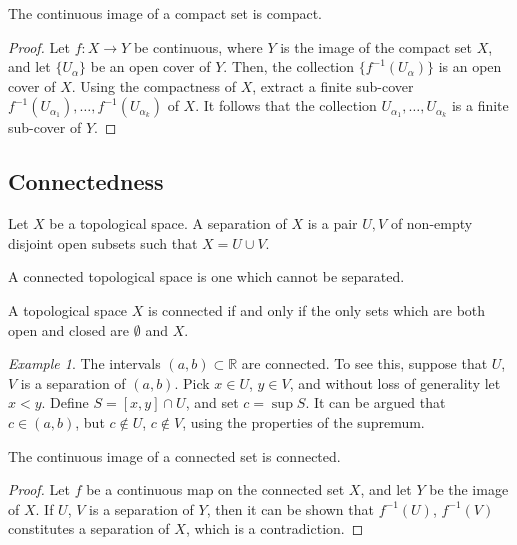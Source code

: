 \documentclass[11pt]{article}
\newcommand{\R}{\mathbb{R}}
\theoremstyle{definition}
\theoremstyle{remark}
\newtheorem*{example}{Example}
\numberwithin{equation}{section}
\begin{document}
    \begin{theorem}
        The continuous image of a compact set is compact.
    \end{theorem}
    \begin{proof}
        Let $f\colon X \to Y$ be continuous, where $Y$ is the image of the compact
        set $X$, and let $\{U_\alpha\}$ be an open cover of $Y$. Then, the collection
        $\{f^{-1}(U_\alpha)\}$ is an open cover of $X$. Using the compactness of $X$,
        extract a finite sub-cover $f^{-1}(U_{\alpha_1}), \dots,
        f^{-1}(U_{\alpha_k})$ of $X$. It follows that the collection $U_{\alpha_1},
        \dots, U_{\alpha_k}$ is a finite sub-cover of $Y$.
    \end{proof}

    \subsection{Connectedness}
    \begin{definition}
        Let $X$ be a topological space. A separation of $X$ is a pair $U, V$ of
        non-empty disjoint open subsets such that $X = U \cup V$.
    \end{definition}

    \begin{definition}
        A connected topological space is one which cannot be separated.
    \end{definition}
    \begin{lemma}
        A topological space $X$ is connected if and only if the only sets which are
        both open and closed are $\emptyset$ and $X$.
    \end{lemma}

    \begin{example}
        The intervals $(a, b) \subset \R$ are connected. To see this, suppose that
        $U$, $V$ is a separation of $(a, b)$. Pick $x \in U$, $y \in V$, and without
        loss of generality let $x < y$. Define $S = [x, y] \cap U$, and set $c =
        \sup{S}$. It can be argued that $c \in (a, b)$, but $c \notin U$, $c \notin
        V$, using the properties of the supremum.
    \end{example}

    \begin{theorem}
        The continuous image of a connected set is connected.
    \end{theorem}
    \begin{proof}
        Let $f$ be a continuous map on the connected set $X$, and let $Y$ be the
        image of $X$. If $U$, $V$ is a separation of $Y$, then it can be shown that
        $f^{-1}(U)$, $f^{-1}(V)$ constitutes a separation of $X$, which is a
        contradiction.
    \end{proof}
\end{document}
